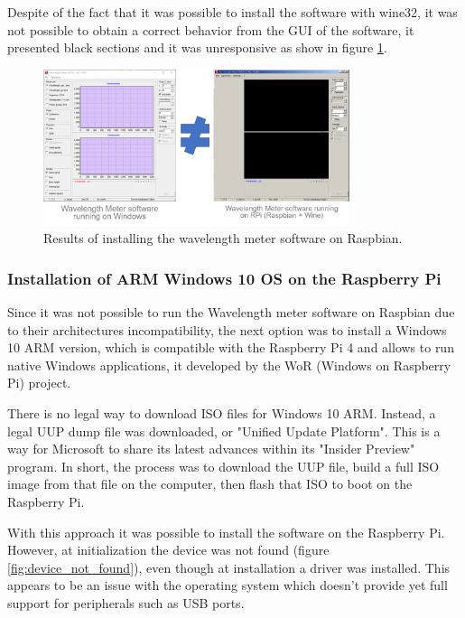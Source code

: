 \documentclass[a4paper,12pt]{article}
\begin{document}
Despite of the fact that it was possible to install the software with wine32, it was not possible to obtain a correct behavior from the GUI of the software, it presented black sections and it was unresponsive as show in figure \ref{fig:raspbian}. 

\begin{figure}[!h]
    \centering
    \includegraphics[width=0.8\textwidth]{Images/rapbian_results.png}
    \captionsetup{justification=centering}
    \caption{Results of installing the wavelength meter software on Raspbian.}
    \label{fig:raspbian}
\end{figure}

\subsubsection{Installation of ARM Windows 10 OS on the Raspberry Pi}

Since it was not possible to run the Wavelength meter software on Raspbian due to their architectures incompatibility, the next option was to install a Windows 10 ARM version, which is compatible with the Raspberry Pi 4 and allows to run native Windows applications, it developed by the WoR (Windows on Raspberry Pi) project.

There is no legal way to download ISO files for Windows 10 ARM. Instead, a legal UUP dump file was downloaded, or "Unified Update Platform". This is a way for Microsoft to share its latest advances within its "Insider Preview" program. In short, the process was to download the UUP file, build a full ISO image from that file on the computer, then flash that ISO to boot on the Raspberry Pi.

With this approach it was possible to install the software on the Raspberry Pi. However, at initialization the device was not found (figure \ref{fig:device_not_found}), even though at installation a driver was installed. This appears to be an issue with the operating system which doesn't provide yet full support for peripherals such as USB ports. 
\end{document}
